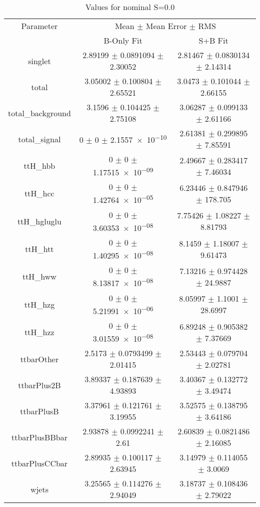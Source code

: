\begin{table}
\centering
\caption{Values for nominal S=0.0}
\begin{tabular}{ccc}
\toprule
Parameter & \multicolumn{2}{c}{Mean $\pm$ Mean Error $\pm$ RMS}\\
 & B-Only Fit & S+B Fit\\
\midrule
singlet & \num{2.89199} $\pm$ \num{0.0891094} $\pm$ \num{2.30052} & \num{2.81467} $\pm$ \num{0.0830134} $\pm$ \num{2.14314}\\
total & \num{3.05002} $\pm$ \num{0.100804} $\pm$ \num{2.65521} & \num{3.0473} $\pm$ \num{0.101044} $\pm$ \num{2.66155}\\
total\_background & \num{3.1596} $\pm$ \num{0.104425} $\pm$ \num{2.75108} & \num{3.06287} $\pm$ \num{0.099133} $\pm$ \num{2.61166}\\
total\_signal & \num{0} $\pm$ \num{0} $\pm$ \num{2.1557e-10} & \num{2.61381} $\pm$ \num{0.299895} $\pm$ \num{7.85591}\\
ttH\_hbb & \num{0} $\pm$ \num{0} $\pm$ \num{1.17515e-09} & \num{2.49667} $\pm$ \num{0.283417} $\pm$ \num{7.46034}\\
ttH\_hcc & \num{0} $\pm$ \num{0} $\pm$ \num{1.42764e-05} & \num{6.23446} $\pm$ \num{0.847946} $\pm$ \num{178.705}\\
ttH\_hgluglu & \num{0} $\pm$ \num{0} $\pm$ \num{3.60353e-08} & \num{7.75426} $\pm$ \num{1.08227} $\pm$ \num{8.81793}\\
ttH\_htt & \num{0} $\pm$ \num{0} $\pm$ \num{1.40295e-08} & \num{8.1459} $\pm$ \num{1.18007} $\pm$ \num{9.61473}\\
ttH\_hww & \num{0} $\pm$ \num{0} $\pm$ \num{8.13817e-08} & \num{7.13216} $\pm$ \num{0.974428} $\pm$ \num{24.9887}\\
ttH\_hzg & \num{0} $\pm$ \num{0} $\pm$ \num{5.21991e-06} & \num{8.05997} $\pm$ \num{1.1001} $\pm$ \num{28.6997}\\
ttH\_hzz & \num{0} $\pm$ \num{0} $\pm$ \num{3.01559e-08} & \num{6.89248} $\pm$ \num{0.905382} $\pm$ \num{7.37669}\\
ttbarOther & \num{2.5173} $\pm$ \num{0.0793499} $\pm$ \num{2.01415} & \num{2.53443} $\pm$ \num{0.079704} $\pm$ \num{2.02781}\\
ttbarPlus2B & \num{3.89337} $\pm$ \num{0.187639} $\pm$ \num{4.93893} & \num{3.40367} $\pm$ \num{0.132772} $\pm$ \num{3.49474}\\
ttbarPlusB & \num{3.37961} $\pm$ \num{0.121761} $\pm$ \num{3.19955} & \num{3.52575} $\pm$ \num{0.138795} $\pm$ \num{3.64186}\\
ttbarPlusBBbar & \num{2.93878} $\pm$ \num{0.0992241} $\pm$ \num{2.61} & \num{2.60839} $\pm$ \num{0.0821486} $\pm$ \num{2.16085}\\
ttbarPlusCCbar & \num{2.89935} $\pm$ \num{0.100117} $\pm$ \num{2.63945} & \num{3.14979} $\pm$ \num{0.114055} $\pm$ \num{3.0069}\\
wjets & \num{3.25565} $\pm$ \num{0.114276} $\pm$ \num{2.94049} & \num{3.18737} $\pm$ \num{0.108436} $\pm$ \num{2.79022}\\
\bottomrule
\end{tabular}
\end{table}